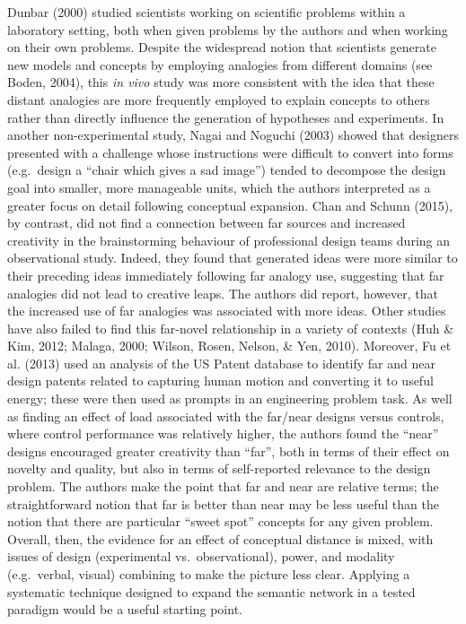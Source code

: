 \documentclass[english,man]{apa6}
\newcounter{author}
\begin{document}
Dunbar (2000) studied scientists working on scientific problems within a
laboratory setting, both when given problems by the authors and when
working on their own problems. Despite the widespread notion that
scientists generate new models and concepts by employing analogies from
different domains (see Boden, 2004), this \emph{in vivo} study was more
consistent with the idea that these distant analogies are more
frequently employed to explain concepts to others rather than directly
influence the generation of hypotheses and experiments. In another
non-experimental study, Nagai and Noguchi (2003) showed that designers
presented with a challenge whose instructions were difficult to convert
into forms (e.g.~design a \enquote{chair which gives a sad image})
tended to decompose the design goal into smaller, more manageable units,
which the authors interpreted as a greater focus on detail following
conceptual expansion. Chan and Schunn (2015), by contrast, did not find
a connection between far sources and increased creativity in the
brainstorming behaviour of professional design teams during an
observational study. Indeed, they found that generated ideas were more
similar to their preceding ideas immediately following far analogy use,
suggesting that far analogies did not lead to creative leaps. The
authors did report, however, that the increased use of far analogies was
associated with more ideas. Other studies have also failed to find this
far-novel relationship in a variety of contexts (Huh \& Kim, 2012;
Malaga, 2000; Wilson, Rosen, Nelson, \& Yen, 2010). Moreover, Fu et al.
(2013) used an analysis of the US Patent database to identify far and
near design patents related to capturing human motion and converting it
to useful energy; these were then used as prompts in an engineering
problem task. As well as finding an effect of load associated with the
far/near designs versus controls, where control performance was
relatively higher, the authors found the \enquote{near} designs
encouraged greater creativity than \enquote{far}, both in terms of their
effect on novelty and quality, but also in terms of self-reported
relevance to the design problem. The authors make the point that far and
near are relative terms; the straightforward notion that far is better
than near may be less useful than the notion that there are particular
\enquote{sweet spot} concepts for any given problem. Overall, then, the
evidence for an effect of conceptual distance is mixed, with issues of
design (experimental vs.~observational), power, and modality
(e.g.~verbal, visual) combining to make the picture less clear. Applying
a systematic technique designed to expand the semantic network in a
tested paradigm would be a useful starting point.
\end{document}
